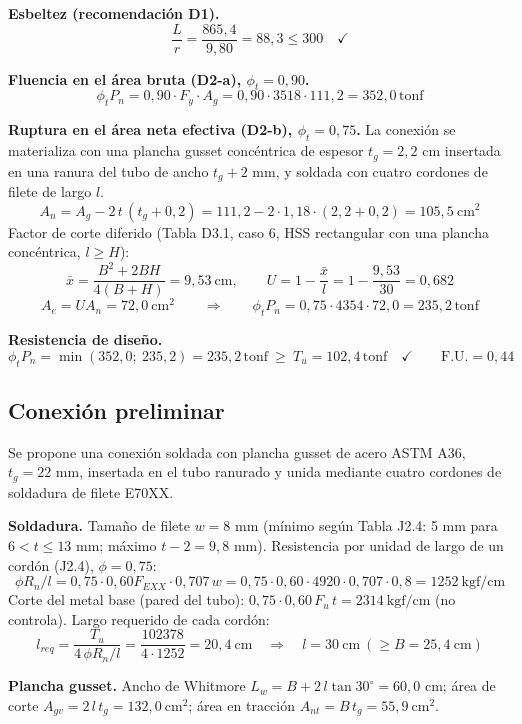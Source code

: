 \documentclass[11pt,letterpaper]{article}
\newcommand{\tonf}{\,\mathrm{tonf}}
\begin{document}
\textbf{Esbeltez (recomendación D1).}
\[
\frac{L}{r} = \frac{865{,}4}{9{,}80} = 88{,}3 \le 300 \quad \checkmark
\]

\textbf{Fluencia en el área bruta (D2-a), $\phi_t = 0{,}90$.}
\[
\phi_t P_n = 0{,}90 \cdot F_y \cdot A_g = 0{,}90 \cdot 3518 \cdot 111{,}2
= 352{,}0\tonf
\]

\textbf{Ruptura en el área neta efectiva (D2-b), $\phi_t = 0{,}75$.}
La conexión se materializa con una plancha gusset concéntrica de espesor $t_g = 2{,}2$ cm insertada en
una ranura del tubo de ancho $t_g + 2$ mm, y soldada con cuatro cordones de filete de largo $l$.
\[
A_n = A_g - 2\,t\,(t_g + 0{,}2) = 111{,}2 - 2\cdot1{,}18\cdot(2{,}2+0{,}2)
= 105{,}5\ \mathrm{cm^2}
\]
Factor de corte diferido (Tabla D3.1, caso 6, HSS rectangular con una plancha concéntrica, $l \ge H$):
\[
\bar{x} = \frac{B^2 + 2BH}{4(B+H)} = 9{,}53\ \mathrm{cm},
\qquad
U = 1 - \frac{\bar{x}}{l} = 1 - \frac{9{,}53}{30} = 0{,}682
\]
\[
A_e = U A_n = 72{,}0\ \mathrm{cm^2}
\qquad\Rightarrow\qquad
\phi_t P_n = 0{,}75 \cdot 4354 \cdot 72{,}0 = 235{,}2\tonf
\]

\textbf{Resistencia de diseño.}
\[
\phi_t P_n = \min(352{,}0;\ 235{,}2) = 235{,}2\tonf
\ \ge\ T_u = 102{,}4\tonf \quad \checkmark
\qquad \text{F.U.} = 0{,}44
\]

\subsection{Conexión preliminar}
Se propone una conexión soldada con plancha gusset de acero ASTM A36, $t_g = 22$ mm, insertada
en el tubo ranurado y unida mediante cuatro cordones de soldadura de filete E70XX.

\textbf{Soldadura.} Tamaño de filete $w = 8$ mm (mínimo según Tabla J2.4: 5 mm para
$6 < t \le 13$ mm; máximo $t - 2 = 9{,}8$ mm).
Resistencia por unidad de largo de un cordón (J2.4), $\phi = 0{,}75$:
\[
\phi R_n/l = 0{,}75 \cdot 0{,}60 F_{EXX} \cdot 0{,}707\,w
= 0{,}75 \cdot 0{,}60 \cdot 4920 \cdot 0{,}707 \cdot 0{,}8
= 1252\ \mathrm{kgf/cm}
\]
Corte del metal base (pared del tubo): $0{,}75\cdot 0{,}60\,F_u\,t = 2314\ \mathrm{kgf/cm}$ (no controla).
Largo requerido de cada cordón:
\[
l_{req} = \frac{T_u}{4\,\phi R_n/l} = \frac{102378}{4 \cdot 1252}
= 20{,}4\ \mathrm{cm}
\quad\Rightarrow\quad l = 30\ \mathrm{cm} \ (\ge B = 25{,}4\ \mathrm{cm})
\]

\textbf{Plancha gusset.} Ancho de Whitmore $L_w = B + 2\,l\tan 30^\circ = 60{,}0$ cm;
área de corte $A_{gv} = 2\,l\,t_g = 132{,}0\ \mathrm{cm^2}$; área en tracción $A_{nt} = B\,t_g = 55{,}9\ \mathrm{cm^2}$.
\end{document}
